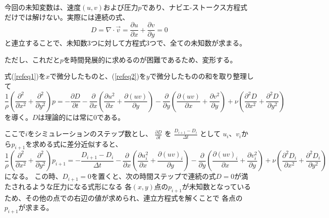 \documentclass{article}
\begin{document}
今回の未知変数は、速度$(u, v)$および圧力$p$であり、ナビエ-ストークス方程式だけでは解けない。実際には連続の式、
\begin{equation}
D = \nabla \cdot \vec{v} = \frac{\partial u}{\partial x} + \frac{\partial v}{\partial y} = 0
\end{equation}
と連立することで、未知数3つに対して方程式3つで、全ての未知数が求まる。

ただし、これだと$p$を時間発展的に求めるのが困難であるため、変形する。

式(\ref{refeq1})を$x$で微分したものと、(\ref{refeq2})を$y$で微分したものの和を取り整理して
\begin{equation}
\frac{1}{\rho} \left(\frac{\partial^2}{\partial x^2} + \frac{\partial^2}{\partial y^2} \right) p 
= 
- \frac{\partial D}{\partial t}
- \frac{\partial}{\partial x} \left( \frac{\partial u^2}{\partial x} + \frac{\partial (u v)}{\partial y} \right)
- \frac{\partial}{\partial y} \left( \frac{\partial (u v)}{\partial x} + \frac{\partial v^2}{\partial y} \right)
+ \nu \left( \frac{\partial^2 D}{\partial x^2} + \frac{\partial^2 D}{\partial y^2} \right)
\end{equation}
を導く。$D$は理論的には常に0である。

ここで$i$をシミュレーションのステップ数とし、
$\frac{\partial D}{\partial t}$
を
$\frac{D_{i+1} - D_i}{\Delta t}$
として
$u_i$、$v_i$から$p_{i+1}$を求める式に差分近似すると、
\begin{equation}
\label{refeq3}
\frac{1}{\rho} \left(\frac{\partial^2}{\partial x^2} + \frac{\partial^2}{\partial y^2} \right) p_{i+1}
= 
- \frac{D_{i+1} - D_i}{\Delta t}
- \frac{\partial}{\partial x} \left( \frac{\partial u_i^2}{\partial x} + \frac{\partial (u v)_i}{\partial y} \right)
- \frac{\partial}{\partial y} \left( \frac{\partial (u v)_i}{\partial x} + \frac{\partial v_i^2}{\partial y} \right)
+ \nu \left( \frac{\partial^2 D_i}{\partial x^2} + \frac{\partial^2 D_i}{\partial y^2} \right)
\end{equation}
になる。
この時、$D_{i+1}=0$を置くと、次の時間ステップで連続の式$D=0$が満たされるような圧力になる式形になる
各$(x,y)$点の$p_{i+1}$が未知数となっているため、その他の点での右辺の値が求められ、連立方程式を解くことで
各点の$p_{i+1}$が求まる。
\end{document}
